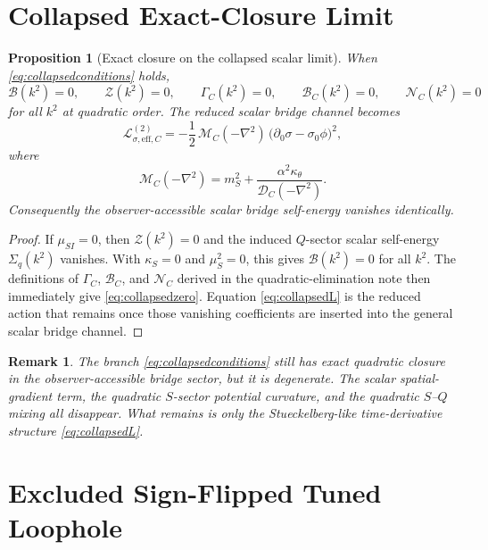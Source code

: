 \documentclass[11pt]{article}
\newtheorem{proposition}{Proposition}
\newtheorem{remark}{Remark}
\begin{document}
\section{Collapsed Exact-Closure Limit}

\begin{proposition}[Exact closure on the collapsed scalar limit]
When \eqref{eq:collapsedconditions} holds,
\begin{equation}
\mathcal B(k^2)=0,
\qquad
\mathcal Z(k^2)=0,
\qquad
\Gamma_C(k^2)=0,
\qquad
\mathcal B_C(k^2)=0,
\qquad
\mathcal N_C(k^2)=0
\label{eq:collapsedzero}
\end{equation}
for all \(k^2\) at quadratic order. The reduced scalar bridge channel becomes
\begin{equation}
\mathcal L_{\sigma,\mathrm{eff},C}^{(2)}
=
-\frac{1}{2}\,
\mathcal M_C(-\nabla^2)\,
\bigl(\partial_0\sigma-\sigma_0\phi\bigr)^2,
\label{eq:collapsedL}
\end{equation}
where
\begin{equation}
\mathcal M_C(-\nabla^2)
=
m_S^2+\frac{\alpha^2\kappa_\theta}{\mathcal D_C(-\nabla^2)}.
\label{eq:collapsedM}
\end{equation}
Consequently the observer-accessible scalar bridge self-energy vanishes identically.
\end{proposition}

\begin{proof}
If \(\mu_{SI}=0\), then \(\mathcal Z(k^2)=0\) and the induced \(Q\)-sector scalar self-energy \(\Sigma_q(k^2)\) vanishes. With \(\kappa_S=0\) and \(\mu_S^2=0\), this gives \(\mathcal B(k^2)=0\) for all \(k^2\). The definitions of \(\Gamma_C\), \(\mathcal B_C\), and \(\mathcal N_C\) derived in the quadratic-elimination note then immediately give \eqref{eq:collapsedzero}. Equation \eqref{eq:collapsedL} is the reduced action that remains once those vanishing coefficients are inserted into the general scalar bridge channel.
\end{proof}

\begin{remark}
The branch \eqref{eq:collapsedconditions} still has exact quadratic closure in the observer-accessible bridge sector, but it is degenerate. The scalar spatial-gradient term, the quadratic \(S\)-sector potential curvature, and the quadratic \(S\)--\(Q\) mixing all disappear. What remains is only the Stueckelberg-like time-derivative structure \eqref{eq:collapsedL}.
\end{remark}

\section{Excluded Sign-Flipped Tuned Loophole}
\end{document}
